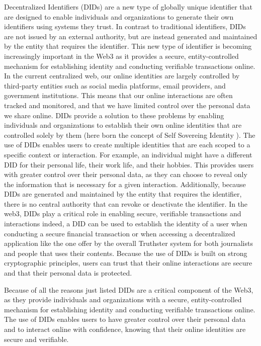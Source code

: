 \documentclass[target=mst,aauheader=]{thud}
\begin{document}
Decentralized Identifiers (DIDs) are a new type of globally unique identifier that are designed to enable individuals and organizations to generate their own identifiers using systems they trust. In contrast to traditional identifiers, DIDs are not issued by an external authority, but are instead generated and maintained by the entity that requires the identifier. This new type of identifier is becoming increasingly important in the Web3 as it provides a secure, entity-controlled mechanism for establishing identity and conducting verifiable transactions online.
In the current centralized web, our online identities are largely controlled by third-party entities such as social media platforms, email providers, and government institutions. This means that our online interactions are often tracked and monitored, and that we have limited control over the personal data we share online. DIDs provide a solution to these problems by enabling individuals and organizations to establish their own online identities that are controlled solely by them (here born the concept of Self Sovereing Identity \cite{selfSovereignIdentity}).
The use of DIDs enables users to create multiple identities that are each scoped to a specific context or interaction. For example, an individual might have a different DID for their personal life, their work life, and their hobbies. This provides users with greater control over their personal data, as they can choose to reveal only the information that is necessary for a given interaction. Additionally, because DIDs are generated and maintained by the entity that requires the identifier, there is no central authority that can revoke or deactivate the identifier.
In the web3, DIDs play a critical role in enabling secure, verifiable transactions and interactions indeed, a DID can be used to establish the identity of a user when conducting a secure financial transaction or when accessing a decentralized application like the one offer by the overall Truthster system for both journalists and people that uses their contents. Because the use of DIDs is built on strong cryptographic principles, users can trust that their online interactions are secure and that their personal data is protected.\par
Because of all the reasons just listed DIDs are a critical component of the Web3, as they provide individuals and organizations with a secure, entity-controlled mechanism for establishing identity and conducting verifiable transactions online. The use of DIDs enables users to have greater control over their personal data and to interact online with confidence, knowing that their online identities are secure and verifiable.
\end{document}
